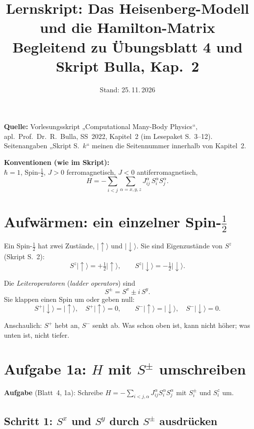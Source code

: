 \documentclass[11pt,a4paper]{article}
\title{Lernskript: Das Heisenberg-Modell und die Hamilton-Matrix\\[2pt]\large Begleitend zu Übungsblatt 4 und Skript Bulla, Kap.~2}
\author{}
\date{Stand: 25.\,11.\,2026}
\newcommand{\ket}[1]{\lvert #1\rangle}
\newcommand{\up}{{\uparrow}}
\newcommand{\dn}{{\downarrow}}
\begin{document}
\maketitle
\vspace{-1.5em}

\noindent\textbf{Quelle:} Vorlesungsskript „Computational Many-Body Physics“, apl.~Prof.~Dr.~R.~Bulla, SS~2022, Kapitel~2 (im Lesepaket S.~3–12). Seitenangaben „Skript S.~$k$“ meinen die Seitennummer innerhalb von Kapitel~2.

\noindent\textbf{Konventionen (wie im Skript):}\\ $\hbar=1$, Spin-$\tfrac12$, $J>0$ ferromagnetisch, $J<0$ antiferromagnetisch,
\[
H = -\sum_{i<j}\sum_{\alpha=x,y,z} J^\alpha_{ij}\,S^\alpha_i S^\alpha_j .
\]

\tableofcontents

\section{Aufwärmen: ein einzelner Spin-\texorpdfstring{$\tfrac12$}{1/2}}

Ein Spin-$\tfrac12$ hat zwei Zustände, $\ket{\up}$ und $\ket{\dn}$. Sie sind Eigenzustände von $S^z$ (Skript S.~2):
\[
S^z\ket{\up} = +\tfrac12\ket{\up},\qquad S^z\ket{\dn} = -\tfrac12\ket{\dn}.
\]

Die \emph{Leiteroperatoren} (\emph{ladder operators}) sind
\[
S^\pm = S^x \pm i\,S^y .
\]
Sie klappen einen Spin um oder geben null:
\[
S^+\ket{\dn} = \ket{\up},\quad S^+\ket{\up} = 0,\qquad S^-\ket{\up} = \ket{\dn},\quad S^-\ket{\dn} = 0 .
\]

\begin{merk}
Anschaulich: $S^+$ hebt an, $S^-$ senkt ab. Was schon oben ist, kann nicht höher; was unten ist, nicht tiefer.
\end{merk}

\section{Aufgabe 1a: \texorpdfstring{$H$}{H} mit \texorpdfstring{$S^\pm$}{S+-} umschreiben}

\textbf{Aufgabe} (Blatt~4, 1a): Schreibe $H = -\sum_{i<j,\alpha} J^\alpha_{ij}S^\alpha_iS^\alpha_j$ mit $S^\pm_i$ und $S^z_i$ um.

\subsection{Schritt 1: \texorpdfstring{$S^x$}{Sx} und \texorpdfstring{$S^y$}{Sy} durch \texorpdfstring{$S^\pm$}{S+-} ausdrücken}
\end{document}
